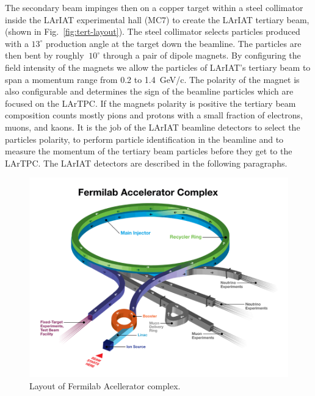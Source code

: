 The secondary beam impinges then on a copper target within a steel collimator inside the LArIAT experimental hall (MC7) to create the LArIAT tertiary beam, (shown in  Fig.~\ref{fig:tert-layout}).   The steel collimator selects particles produced with a $13^\circ$ production angle at the target down the beamline.  The particles are then bent by roughly $~10^\circ$  through a pair of dipole magnets.  By configuring the field intensity of the magnets we allow the particles of LArIAT's tertiary beam to span a momentum range from 0.2 to 1.4~GeV/c. The polarity of the magnet is also configurable and determines the sign of the beamline particles which are focused on the LArTPC. If the magnets polarity is positive the tertiary beam composition counts mostly pions and protons with a small fraction of electrons, muons, and kaons. It is the job of the LArIAT beamline detectors to select the particles polarity,  to perform particle identification in the beamline and to measure the momentum of the tertiary beam particles before they get to the LArTPC. The LArIAT detectors are described in the following paragraphs.  



\begin{figure}
  \centering  	
\includegraphics[width=\textwidth,height=\textheight,keepaspectratio]{Chapter-3/Images/AcceleratorFNAL.png}
\caption{Layout of Fermilab Acellerator complex.}
\label{fig:Accelerator}
\end{figure}

